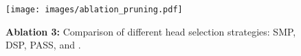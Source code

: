 \begin{figure}[!htb]
    \centering
    \texttt{[image: images/ablation\_pruning.pdf]}
    \caption{\label{fig:ablation_pruning}
    \textbf{Ablation 3:} Comparison of different head selection strategies: SMP, DSP, PASS, and \jola{}.
    }
\end{figure}
